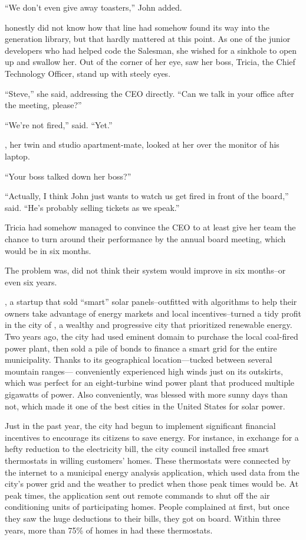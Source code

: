 ``We don't even give away toasters,'' John added.

{\protag} honestly did not know how that line had somehow found its way into the generation library, but that hardly mattered at this point. As one of the junior developers who had helped code the Salesman, she wished for a sinkhole to open up and swallow her. Out of the corner of her eye, {\protag} saw her boss, Tricia, the Chief Technology Officer, stand up with steely eyes.

``Steve,'' she said, addressing the CEO directly. ``Can we talk in your office after the meeting, please?''

\bigbreak

``We're not fired,'' {\protag} said. ``Yet.''

{\sidetag}, her twin and studio apartment-mate, looked at her over the monitor of his laptop.

``Your boss talked down her boss?''

``Actually, I think John just wants to watch us get fired in front of the board,'' {\protag} said. ``He's probably selling tickets as we speak.''

Tricia had somehow managed to convince the CEO to at least give her team the chance to turn around their performance by the annual board meeting, which would be in six months.

The problem was, {\protag} did not think their system would improve in six months--or even six years. 

 {\energyCompany}, a startup that sold ``smart'' solar panels--outfitted with algorithms to help their owners take advantage of energy markets and local incentives--turned a tidy profit in the city of {\crunchyCity}, a wealthy and progressive city that prioritized renewable energy. Two years ago, the city had used eminent domain to purchase the local coal-fired power plant, then sold a pile of bonds to finance a smart grid for the entire municipality. Thanks to its geographical location---tucked between several mountain ranges---\crunchyCity{} conveniently experienced high winds just on its outskirts, which was perfect for an eight-turbine wind power plant that produced multiple gigawatts of power. Also conveniently, \crunchyCity{} was blessed with more sunny days than not, which made it one of the best cities in the United States for solar power.

Just in the past year, the city had begun to implement significant financial incentives to encourage its citizens to save energy. For instance, in exchange for a hefty reduction to the electricity bill, the city council installed free smart thermostats in willing customers' homes. These thermostats were connected by the internet to a municipal energy analysis application, which used data from the city's power grid and the weather to predict when those peak times would be. At peak times, the application sent out remote commands to shut off the air conditioning units of participating homes. People complained at first, but once they saw the huge deductions to their bills, they got on board. Within three years, more than 75\% of homes in \crunchyCity{} had these thermostats.

